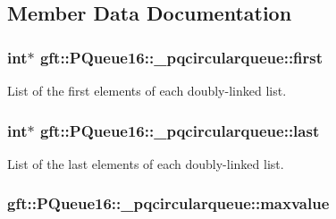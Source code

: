 \subsection{Member Data Documentation}
\subsubsection[{\texorpdfstring{first}{first}}]{\setlength{\rightskip}{0pt plus 5cm}int$\ast$ gft\+::\+P\+Queue16\+::\+\_\+pqcircularqueue\+::first}\hypertarget{structgft_1_1PQueue16_1_1__pqcircularqueue_aeda855ff236bb30b8269239931656ed7}{}\label{structgft_1_1PQueue16_1_1__pqcircularqueue_aeda855ff236bb30b8269239931656ed7}


List of the first elements of each doubly-\/linked list. 

\subsubsection[{\texorpdfstring{last}{last}}]{\setlength{\rightskip}{0pt plus 5cm}int$\ast$ gft\+::\+P\+Queue16\+::\+\_\+pqcircularqueue\+::last}\hypertarget{structgft_1_1PQueue16_1_1__pqcircularqueue_a6a74e64858b82a1b274731c5758ba162}{}\label{structgft_1_1PQueue16_1_1__pqcircularqueue_a6a74e64858b82a1b274731c5758ba162}


List of the last elements of each doubly-\/linked list. 

\subsubsection[{\texorpdfstring{maxvalue}{maxvalue}}]{ gft\+::\+P\+Queue16\+::\+\_\+pqcircularqueue\+::maxvalue}\hypertarget{structgft_1_1PQueue16_1_1__pqcircularqueue_acc9c8a89ad23c5a641fee6e38a2b7bd9}{}\label{structgft_1_1PQueue16_1_1__pqcircularqueue_acc9c8a89ad23c5a641fee6e38a2b7bd9}


